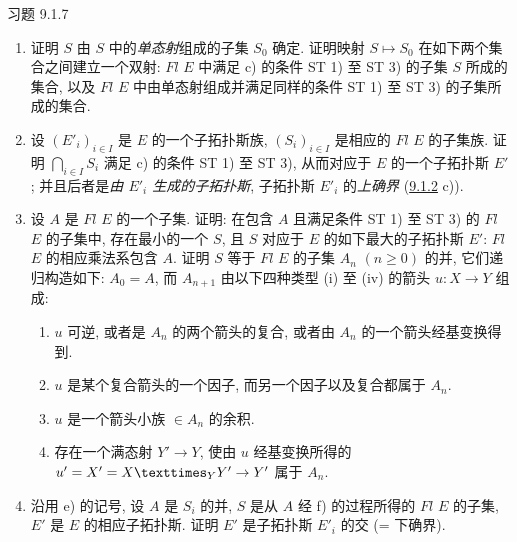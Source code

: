 \begin{enonce*}[remark]{习题 9.1.7}
\begin{enumerate}
\item 证明 $S$ 由 $S$ 中的\emph{单态射}组成的子集 $S_0$ 确定.
证明映射 $S\mapsto S_0$ 在如下两个集合之间建立一个双射:
$Fl$ $E$ 中满足 c) 的条件 ST 1) 至 ST 3) 的子集 $S$ 所成的集合,
以及 $Fl$ $E$ 中由单态射\pageoriginale 组成并满足同样的条件 ST 1) 至 ST 3)
的子集所成的集合.

\item 设 $(E'_i)_{i\in I}$ 是 $E$ 的一个子拓扑斯族,
$(S_i)_{i\in I}$ 是相应的 $Fl$ $E$ 的子集族.
证明 $\bigcap_{i\in I} S_i$ 满足 c) 的条件 ST 1) 至 ST 3),
从而对应于 $E$ 的一个子拓扑斯 $E'$;
并且后者是\emph{由 $E'_i$ 生成的子拓扑斯},
\ie 子拓扑斯 $E'_i$ 的\emph{上确界}
(\cf \hyperref[IV.rem9.1.2]{9.1.2} c)).

\item 设 $A$ 是 $Fl$ $E$ 的一个子集.
证明: 在包含 $A$ 且满足条件 ST 1) 至 ST 3) 的 $Fl$ $E$ 的子集中,
存在最小的一个 $S$,
且 $S$ 对应于 $E$ 的如下最大的子拓扑斯 $E'$:
$Fl$ $E$ 的相应乘法系包含 $A$.
证明 $S$ 等于 $Fl$ $E$ 的子集 $A_n$ $(n\geq0)$ 的并,
它们递归构造如下:
$A_0=A$, 而 $A_{n+1}$ 由以下四种类型 (i) 至 (iv) 的箭头 $u:X\rightarrow Y$ 组成:
\begin{enumerate}
\renewcommand{\theenumii}{\roman{enumii}}
\renewcommand{\labelenumii}{(\theenumii)}
\item $u$ 可逆, 或者是 $A_n$ 的两个箭头的复合,
或者由 $A_n$ 的一个箭头经基变换得到.

\item $u$ 是某个复合箭头的一个因子,
而另一个因子以及复合都属于 $A_n$.

\item $u$ 是一个箭头小族 $\in A_n$ 的余积.

\item 存在一个满态射 $Y'\rightarrow Y$,
使由 $u$ 经基变换所得的
$u'=X'=\fprod{X}{Y'}{Y}\rightarrow Y'$ 属于 $A_n$.
\end{enumerate}

\item 沿用 e) 的记号, 设 $A$ 是 $S_i$ 的并,
$S$ 是从 $A$ 经 f) 的过程所得的 $Fl$ $E$ 的子集,
$E'$ 是 $E$ 的相应子拓扑斯.
证明 $E'$ 是子拓扑斯 $E'_i$ 的交 (= 下确界).
\end{enumerate}
\end{enonce*}



